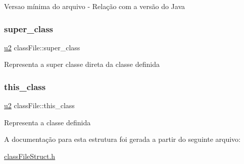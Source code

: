 Versao mínima do arquivo -\/ Relação com a versão do Java \mbox{\label{structclassFile_a7d16e11061e4520ac93df39a5a65a215}} 
\subsubsection{\texorpdfstring{super\+\_\+class}{super\_class}}
{\footnotesize\ttfamily \hyperlink{lista__operandos_8h_a732cde1300aafb73b0ea6c2558a7a54f}{u2} class\+File\+::super\+\_\+class}

Representa a super classe direta da classe definida \mbox{\label{structclassFile_a152ce2f57b3fa175b95069452f9fa063}} 
\subsubsection{\texorpdfstring{this\+\_\+class}{this\_class}}
{\footnotesize\ttfamily \hyperlink{lista__operandos_8h_a732cde1300aafb73b0ea6c2558a7a54f}{u2} class\+File\+::this\+\_\+class}

Representa a classe definida 

A documentação para esta estrutura foi gerada a partir do seguinte arquivo\+:\begin{DoxyCompactItemize}
\item 
\hyperlink{classFileStruct_8h}{class\+File\+Struct.\+h}\end{DoxyCompactItemize}
